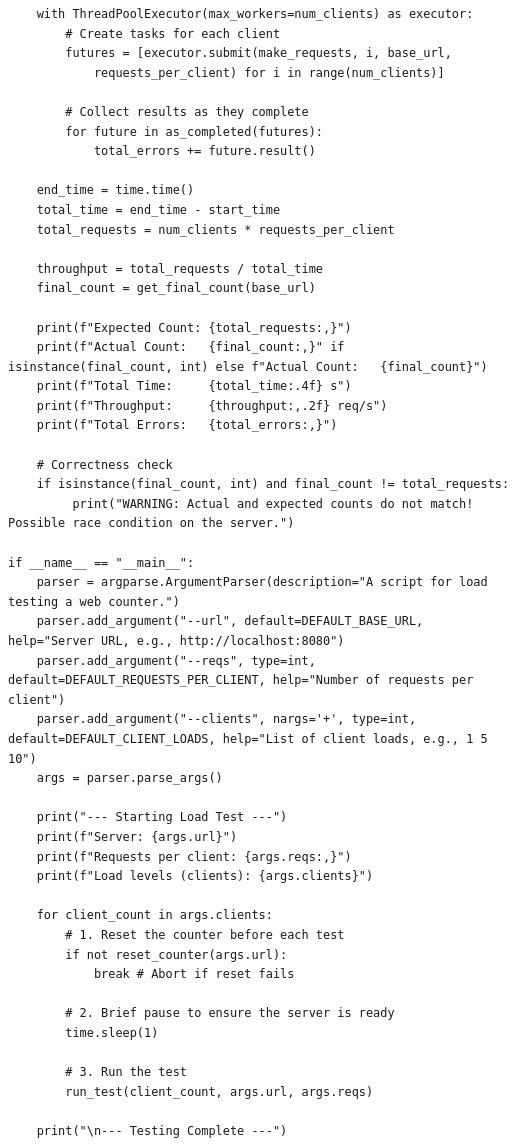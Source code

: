 \documentclass[12pt,a4paper]{article}
\begin{document}
\begin{verbatim}
    with ThreadPoolExecutor(max_workers=num_clients) as executor:
        # Create tasks for each client
        futures = [executor.submit(make_requests, i, base_url, 
            requests_per_client) for i in range(num_clients)]
        
        # Collect results as they complete
        for future in as_completed(futures):
            total_errors += future.result()

    end_time = time.time()
    total_time = end_time - start_time
    total_requests = num_clients * requests_per_client
    
    throughput = total_requests / total_time
    final_count = get_final_count(base_url)
    
    print(f"Expected Count: {total_requests:,}")
    print(f"Actual Count:   {final_count:,}" if isinstance(final_count, int) else f"Actual Count:   {final_count}")
    print(f"Total Time:     {total_time:.4f} s")
    print(f"Throughput:     {throughput:,.2f} req/s")
    print(f"Total Errors:   {total_errors:,}")
    
    # Correctness check
    if isinstance(final_count, int) and final_count != total_requests:
         print("WARNING: Actual and expected counts do not match! Possible race condition on the server.")

if __name__ == "__main__":
    parser = argparse.ArgumentParser(description="A script for load testing a web counter.")
    parser.add_argument("--url", default=DEFAULT_BASE_URL, help="Server URL, e.g., http://localhost:8080")
    parser.add_argument("--reqs", type=int, default=DEFAULT_REQUESTS_PER_CLIENT, help="Number of requests per client")
    parser.add_argument("--clients", nargs='+', type=int, default=DEFAULT_CLIENT_LOADS, help="List of client loads, e.g., 1 5 10")
    args = parser.parse_args()

    print("--- Starting Load Test ---")
    print(f"Server: {args.url}")
    print(f"Requests per client: {args.reqs:,}")
    print(f"Load levels (clients): {args.clients}")

    for client_count in args.clients:
        # 1. Reset the counter before each test
        if not reset_counter(args.url):
            break # Abort if reset fails

        # 2. Brief pause to ensure the server is ready
        time.sleep(1)

        # 3. Run the test
        run_test(client_count, args.url, args.reqs)

    print("\n--- Testing Complete ---")
\end{verbatim}
\end{document}
